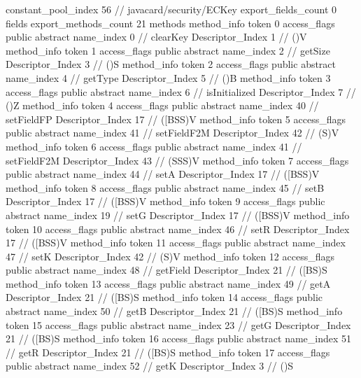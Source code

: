 {{{{				constant_pool_index	56		// javacard/security/ECKey
			}
			export_fields_count	0
			fields {
			}
			export_methods_count	21
			methods {
				method_info {
					token	0
					access_flags	public abstract
					name_index	0		// clearKey
					Descriptor_Index	1		// ()V
				}
				method_info {
					token	1
					access_flags	public abstract
					name_index	2		// getSize
					Descriptor_Index	3		// ()S
				}
				method_info {
					token	2
					access_flags	public abstract
					name_index	4		// getType
					Descriptor_Index	5		// ()B
				}
				method_info {
					token	3
					access_flags	public abstract
					name_index	6		// isInitialized
					Descriptor_Index	7		// ()Z
				}
				method_info {
					token	4
					access_flags	public abstract
					name_index	40		// setFieldFP
					Descriptor_Index	17		// ([BSS)V
				}
				method_info {
					token	5
					access_flags	public abstract
					name_index	41		// setFieldF2M
					Descriptor_Index	42		// (S)V
				}
				method_info {
					token	6
					access_flags	public abstract
					name_index	41		// setFieldF2M
					Descriptor_Index	43		// (SSS)V
				}
				method_info {
					token	7
					access_flags	public abstract
					name_index	44		// setA
					Descriptor_Index	17		// ([BSS)V
				}
				method_info {
					token	8
					access_flags	public abstract
					name_index	45		// setB
					Descriptor_Index	17		// ([BSS)V
				}
				method_info {
					token	9
					access_flags	public abstract
					name_index	19		// setG
					Descriptor_Index	17		// ([BSS)V
				}
				method_info {
					token	10
					access_flags	public abstract
					name_index	46		// setR
					Descriptor_Index	17		// ([BSS)V
				}
				method_info {
					token	11
					access_flags	public abstract
					name_index	47		// setK
					Descriptor_Index	42		// (S)V
				}
				method_info {
					token	12
					access_flags	public abstract
					name_index	48		// getField
					Descriptor_Index	21		// ([BS)S
				}
				method_info {
					token	13
					access_flags	public abstract
					name_index	49		// getA
					Descriptor_Index	21		// ([BS)S
				}
				method_info {
					token	14
					access_flags	public abstract
					name_index	50		// getB
					Descriptor_Index	21		// ([BS)S
				}
				method_info {
					token	15
					access_flags	public abstract
					name_index	23		// getG
					Descriptor_Index	21		// ([BS)S
				}
				method_info {
					token	16
					access_flags	public abstract
					name_index	51		// getR
					Descriptor_Index	21		// ([BS)S
				}
				method_info {
					token	17
					access_flags	public abstract
					name_index	52		// getK
					Descriptor_Index	3		// ()S
				}
}}}}
